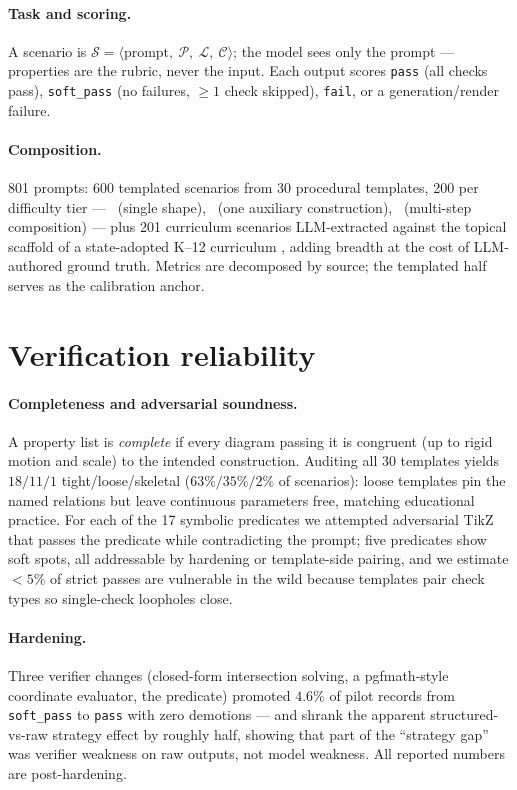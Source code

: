 \documentclass{article}
\begin{document}
\paragraph{Task and scoring.}
A scenario is $\mathcal{S} = \langle \text{prompt},\ \mathcal{P},\ \mathcal{L},\ \mathcal{C} \rangle$; the model sees only the prompt --- properties are the rubric, never the input.
Each output scores \texttt{pass} (all checks pass), \texttt{soft\_pass} (no failures, $\geq1$ check skipped), \texttt{fail}, or a generation/render failure.

\paragraph{Composition.}
801 prompts: 600 templated scenarios from 30 procedural templates, 200 per difficulty tier --- \tone\ (single shape), \ttwo\ (one auxiliary construction), \tthree\ (multi-step composition) --- plus 201 curriculum scenarios LLM-extracted against the topical scaffold of a state-adopted K--12 curriculum \citep{bluebonnet2024}, adding breadth at the cost of LLM-authored ground truth.
Metrics are decomposed by source; the templated half serves as the calibration anchor.

\section{Verification reliability}
\label{sec:verification}

\paragraph{Completeness and adversarial soundness.}
A property list is \emph{complete} if every diagram passing it is congruent (up to rigid motion and scale) to the intended construction.
Auditing all 30 templates yields $18/11/1$ tight/loose/skeletal ($63\%/35\%/2\%$ of scenarios): loose templates pin the named relations but leave continuous parameters free, matching educational practice.
For each of the 17 symbolic predicates we attempted adversarial TikZ that passes the predicate while contradicting the prompt; five predicates show soft spots, all addressable by hardening or template-side pairing, and we estimate $<5\%$ of strict passes are vulnerable in the wild because templates pair check types so single-check loopholes close.

\paragraph{Hardening.}
Three verifier changes (closed-form intersection solving, a pgfmath-style coordinate evaluator, the  predicate) promoted $4.6\%$ of pilot records from \texttt{soft\_pass} to \texttt{pass} with zero demotions --- and shrank the apparent structured-vs-raw strategy effect by roughly half, showing that part of the ``strategy gap'' was verifier weakness on raw outputs, not model weakness.
All reported numbers are post-hardening.
\end{document}
